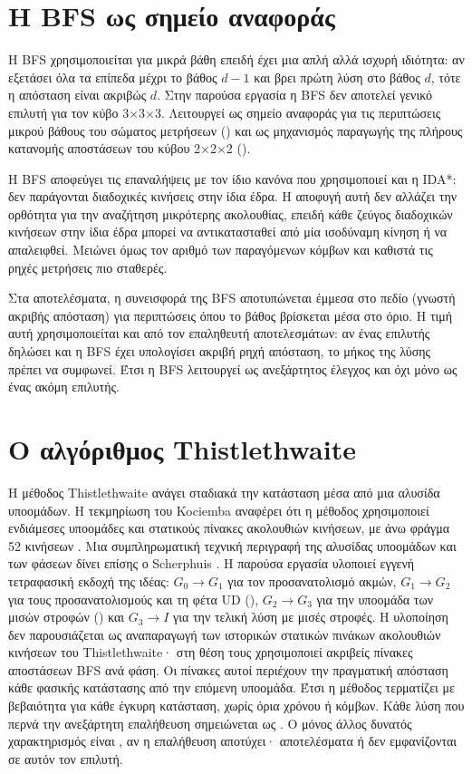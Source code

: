 \section{Η BFS ως σημείο αναφοράς}
\label{sec:algorithms-bfs}
Η BFS χρησιμοποιείται για μικρά βάθη επειδή έχει μια απλή αλλά ισχυρή ιδιότητα: αν εξετάσει όλα τα επίπεδα μέχρι το βάθος \(d-1\) και βρει πρώτη λύση στο βάθος \(d\), τότε η απόσταση είναι ακριβώς \(d\). Στην παρούσα εργασία η BFS δεν αποτελεί γενικό επιλυτή για τον κύβο 3×3×3. Λειτουργεί ως σημείο αναφοράς για τις περιπτώσεις μικρού βάθους του σώματος μετρήσεων () και ως μηχανισμός παραγωγής της πλήρους κατανομής αποστάσεων του κύβου 2×2×2 ().

Η BFS αποφεύγει τις επαναλήψεις με τον ίδιο κανόνα που χρησιμοποιεί και η IDA*: δεν παράγονται διαδοχικές κινήσεις στην ίδια έδρα. Η αποφυγή αυτή δεν αλλάζει την ορθότητα για την αναζήτηση μικρότερης ακολουθίας, επειδή κάθε ζεύγος διαδοχικών κινήσεων στην ίδια έδρα μπορεί να αντικατασταθεί από μία ισοδύναμη κίνηση ή να απαλειφθεί. Μειώνει όμως τον αριθμό των παραγόμενων κόμβων και καθιστά τις ρηχές μετρήσεις πιο σταθερές.

Στα αποτελέσματα, η συνεισφορά της BFS αποτυπώνεται έμμεσα στο πεδίο  (γνωστή ακριβής απόσταση) για περιπτώσεις όπου το βάθος βρίσκεται μέσα στο όριο. Η τιμή αυτή χρησιμοποιείται και από τον επαληθευτή αποτελεσμάτων: αν ένας επιλυτής δηλώσει  και η BFS έχει υπολογίσει ακριβή ρηχή απόσταση, το μήκος της λύσης πρέπει να συμφωνεί. Έτσι η BFS λειτουργεί ως ανεξάρτητος έλεγχος και όχι μόνο ως ένας ακόμη επιλυτής.

\section{Ο αλγόριθμος Thistlethwaite}
\label{sec:algorithms-thistlethwaite}
Η μέθοδος Thistlethwaite ανάγει σταδιακά την κατάσταση μέσα από μια αλυσίδα υποομάδων. Η τεκμηρίωση του Kociemba αναφέρει ότι η μέθοδος χρησιμοποιεί ενδιάμεσες υποομάδες και στατικούς πίνακες ακολουθιών κινήσεων, με άνω φράγμα 52 κινήσεων \cite{kociembaImplementationDetails}. Μια συμπληρωματική τεχνική περιγραφή της αλυσίδας υποομάδων και των φάσεων δίνει επίσης ο Scherphuis \cite{scherphuisThistlethwaite}. Η παρούσα εργασία υλοποιεί εγγενή τετραφασική εκδοχή της ιδέας: \(G_0 \rightarrow G_1\) για τον προσανατολισμό ακμών, \(G_1 \rightarrow G_2\) για τους προσανατολισμούς και τη φέτα UD (), \(G_2 \rightarrow G_3\) για την υποομάδα των μισών στροφών () και \(G_3 \rightarrow I\) για την τελική λύση με μισές στροφές. Η υλοποίηση δεν παρουσιάζεται ως αναπαραγωγή των ιστορικών στατικών πινάκων ακολουθιών κινήσεων του Thistlethwaite· στη θέση τους χρησιμοποιεί ακριβείς πίνακες αποστάσεων BFS ανά φάση. Οι πίνακες αυτοί περιέχουν την πραγματική απόσταση κάθε φασικής κατάστασης από την επόμενη υποομάδα. Έτσι η μέθοδος τερματίζει με βεβαιότητα για κάθε έγκυρη κατάσταση, χωρίς όρια χρόνου ή κόμβων. Κάθε λύση που περνά την ανεξάρτητη επαλήθευση σημειώνεται ως . Ο μόνος άλλος δυνατός χαρακτηρισμός είναι , αν η επαλήθευση αποτύχει· αποτελέσματα  ή  δεν εμφανίζονται σε αυτόν τον επιλυτή.

